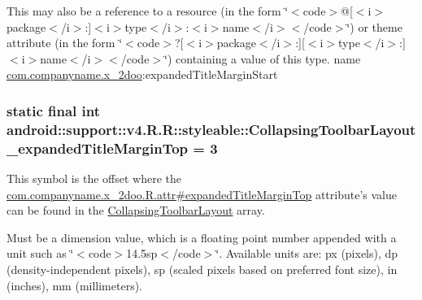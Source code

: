 This may also be a reference to a resource (in the form \char`\"{}$<$code$>$@\mbox{[}$<$i$>$package$<$/i$>$:\mbox{]}$<$i$>$type$<$/i$>$:$<$i$>$name$<$/i$>$$<$/code$>$\char`\"{}) or theme attribute (in the form \char`\"{}$<$code$>$?\mbox{[}$<$i$>$package$<$/i$>$:\mbox{]}\mbox{[}$<$i$>$type$<$/i$>$:\mbox{]}$<$i$>$name$<$/i$>$$<$/code$>$\char`\"{}) containing a value of this type.  name \hyperlink{namespacecom_1_1companyname_1_1x__2doo}{com.companyname.x\_\-2doo}:expandedTitleMarginStart \hypertarget{classandroid_1_1support_1_1v4_1_1_r_1_1styleable_ed514040b0b3e40f9813597f18ec5fa8}{
\subsubsection[{CollapsingToolbarLayout\_\-expandedTitleMarginTop}]{\setlength{\rightskip}{0pt plus 5cm}static final int android::support::v4.R.R::styleable::CollapsingToolbarLayout\_\-expandedTitleMarginTop = 3}}
\label{classandroid_1_1support_1_1v4_1_1_r_1_1styleable_ed514040b0b3e40f9813597f18ec5fa8}


This symbol is the offset where the \hyperlink{classcom_1_1companyname_1_1x__2doo_1_1_r_1_1attr_68db3745bedf6a114ea2dd7004dff985}{com.companyname.x\_\-2doo.R.attr\#expandedTitleMarginTop} attribute's value can be found in the \hyperlink{classandroid_1_1support_1_1v4_1_1_r_1_1styleable_aa101903fcf4b45a3b7fee0a0abc5ea8}{CollapsingToolbarLayout} array.

Must be a dimension value, which is a floating point number appended with a unit such as \char`\"{}$<$code$>$14.5sp$<$/code$>$\char`\"{}. Available units are: px (pixels), dp (density-independent pixels), sp (scaled pixels based on preferred font size), in (inches), mm (millimeters). 

